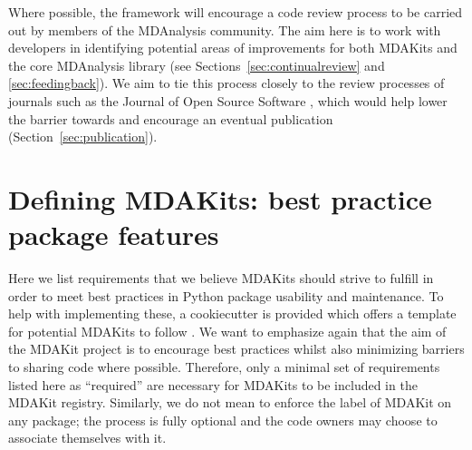 \documentclass[9pt,whitepaper]{livecoms}
\begin{document}
Where possible, the framework will encourage a code review process to be carried out by members of the MDAnalysis community. The aim here is to work with developers in identifying potential areas of improvements for both MDAKits and the core MDAnalysis library (see Sections~\ref{sec:continualreview} and \ref{sec:feedingback}). We aim to tie this process closely to the review processes of journals such as the Journal of Open Source Software \cite{noauthor_journal_nodate}, which would help lower the barrier towards and encourage an eventual publication (Section~\ref{sec:publication}).

\section{Defining MDAKits: best practice package features}
\label{sec:definitions}

Here we list requirements that we believe MDAKits should strive to fulfill in order to meet best practices in Python package usability and maintenance. To help with implementing these, a cookiecutter is provided which offers a template for potential MDAKits to follow \cite{wang_cookiecutter_nodate}. We want to emphasize again that the aim of the MDAKit project is to encourage best practices whilst also minimizing barriers to sharing code where possible. Therefore, only a minimal set of requirements listed here as “required” are necessary for MDAKits to be included in the MDAKit registry. Similarly, we do not mean to enforce the label of MDAKit on any package; the process is fully optional and the code owners may choose to associate themselves with it.
\end{document}
